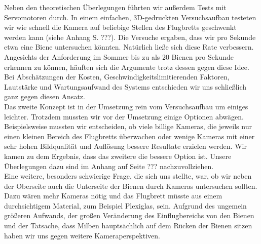 \documentclass[11pt,a4paper]{article}
\begin{document}
Neben den theoretischen Überlegungen führten wir außerdem Tests mit Servomotoren durch. In einem einfachen, 3D-gedruckten Versuchsaufbau testeten wir wie schnell die Kamera auf beliebige Stellen des Flugbretts geschwenkt werden kann (siehe Anhang S. ???). Die Versuche ergaben, dass wir pro Sekunde etwa eine Biene untersuchen könnten. Natürlich ließe sich diese Rate verbessern. Angesichts der Anforderung im Sommer bis zu als 20 Bienen pro Sekunde erkennen zu können, häuften sich die Argumente trotz dessen gegen diese Idee. Bei Abschätzungen der Kosten, Geschwindigkeitslimitierenden Faktoren, Lautstärke und Wartungsaufwand des Systems entschieden wir uns schließlich ganz gegen diesen Ansatz.\\
Das zweite Konzept ist in der Umsetzung rein vom Versuchsaufbau um einiges leichter. Trotzdem mussten wir vor der Umsetzung einige Optionen abwägen. Beispielsweise mussten wir entscheiden, ob viele billige Kameras, die jeweils nur einen kleinen Bereich des Flugbretts überwachen oder wenige Kameras mit einer sehr hohen Bildqualität und Auflösung bessere Resultate erzielen werden. Wir kamen zu dem Ergebnis, dass das zweitere die bessere Option ist. Unsere Überlegungen dazu sind im Anhang auf Seite ??? nachzuvollziehen.\\
Eine weitere, besonders schwierige Frage, die sich uns stellte, war, ob wir neben der Oberseite auch die Unterseite der Bienen durch Kameras untersuchen sollten. Dazu wären mehr Kameras nötig und das Flugbrett müsste aus einem durchsichtigem Material, zum Beispiel Plexiglas, sein. 	Aufgrund des ungemein größeren Aufwands, der großen Veränderung des Einflugbereichs von den Bienen und der Tatsache, dass Milben hauptsächlich auf dem Rücken der Bienen sitzen haben wir uns gegen weitere Kameraperspektiven.\\
\end{document}
